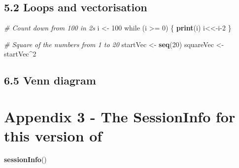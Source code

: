 \documentclass[a4paper]{book}
\newenvironment{Shaded}{\begin{snugshade}}{\end{snugshade}}
\newcommand{\KeywordTok}[1]{\textcolor[rgb]{0.13,0.29,0.53}{\textbf{{#1}}}}
\newcommand{\DecValTok}[1]{\textcolor[rgb]{0.00,0.00,0.81}{{#1}}}
\newcommand{\StringTok}[1]{\textcolor[rgb]{0.31,0.60,0.02}{{#1}}}
\newcommand{\CommentTok}[1]{\textcolor[rgb]{0.56,0.35,0.01}{\textit{{#1}}}}
\newcommand{\NormalTok}[1]{{#1}}
\renewenvironment{Shaded}
{\vspace{1.5em}\begin{leftbar}\begin{snugshade}}
{\end{snugshade}\end{leftbar}\vspace{3pt}}
\begin{document}
\section*{5.2 Loops and vectorisation}\label{loops-and-vectorisation}

\begin{Shaded}
\begin{Highlighting}[]
\CommentTok{# Count down from 100 in 2s}
\NormalTok{i <-}\StringTok{ }\DecValTok{100}
\NormalTok{while (i >=}\StringTok{ }\DecValTok{0}\NormalTok{) \{}
  \KeywordTok{print}\NormalTok{(i)}
  \NormalTok{i<<-i}\DecValTok{-2}
\NormalTok{\}}

\CommentTok{# Square of the numbers from 1 to 20}
\NormalTok{startVec <-}\StringTok{ }\KeywordTok{seq}\NormalTok{(}\DecValTok{20}\NormalTok{)}
\NormalTok{squareVec <-}\StringTok{ }\NormalTok{startVec^}\DecValTok{2}
\end{Highlighting}
\end{Shaded}

\section*{6.5 Venn diagram}\label{venn-diagram}

\begin{Shaded}
\end{Shaded}

\chapter*{Appendix 3 - The SessionInfo for this version
of}\label{appendix-3---the-sessioninfo-for-this-version-of}

\begin{Shaded}
\begin{Highlighting}[]
\KeywordTok{sessionInfo}\NormalTok{()}
\end{Highlighting}
\end{Shaded}
\end{document}
